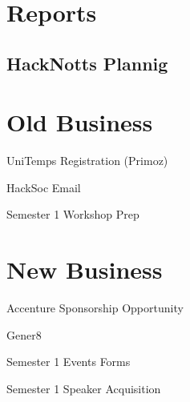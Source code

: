 \documentclass[11pt,hacksoc,agenda]{meetingmins}
\begin{document}
\maketitle

\section{Reports}

\subsection{HackNotts Plannig}
\begin{hiddensubitems}
	\item
		
\end{hiddensubitems}

\section{Old Business}
\begin{items}
	\item
	UniTemps Registration (Primoz)
	
	\item
	HackSoc Email
	
	\item
	Semester 1 Workshop Prep
\end{items}

\section{New Business}
\begin{items}
	\item
	Accenture Sponsorship Opportunity
	
	\item
	Gener8
	
	\item
	Semester 1 Events Forms
	
	\item
	Semester 1 Speaker Acquisition
\end{items}

\vspace{1em}
\nextmeeting{}
\end{document}
